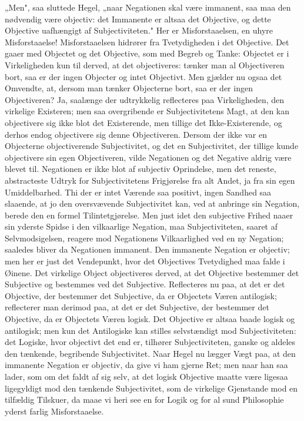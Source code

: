 \documentclass[12pt]{book}
\newcommand{\opage}[1]{\marginnote{\footnotesize\textit{[#1]}}}
\begin{document}
„Men", saa sluttede Hegel, „naar Negationen skal være immanent, saa maa den nødvendig være
objectiv: det Immanente er altsaa det Objective, og dette Objective uafhængigt af
Subjectiviteten." Her er Misforstaaelsen, en uhyre Misforstaaelse! Misforstaaelsen hidrører
fra Tvetydigheden i det Objective. Det gaaer med Objectet og det Objective, som med Begreb og
Tanke: Objectet er i Virkeligheden kun til derved, at det objectiveres: tænker man al
Objectiveren bort, saa er der ingen Objecter og intet Objectivt. Men gjælder nu ogsaa det
Omvendte, at, dersom man tænker Objecterne bort, saa er der ingen Objectiveren? Ja, saalænge
der udtrykkelig reflecteres paa Virkeligheden, den virkelige Existeren; men saa overgribende
er Subjectivitetens Magt, at den kan objectivere sig ikke blot det Existerende, men tillige
det Ikke-Existerende, og derhos endog objectivere sig denne Objectiveren. Dersom der ikke var
en Objecterne objectiverende Subjectivitet, og det en Subjectivitet, der tillige kunde
objectivere sin egen Objectiveren, vilde Negationen og det Negative aldrig være blevet til.
Negationen er ikke blot af subjectiv Oprindelse, men det reneste, abstracteste Udtryk for
Subjectivitetens Frigjørelse fra alt Andet, ja fra sin egen Umiddelbarhed. Thi der er intet
Værende saa positivt, ingen Sandhed saa slaaende, at jo den oversvævende Subjectivitet kan,
ved at anbringe sin Negation, berede den en formel Tilintetgjørelse. Men just idet den
\opage{149} subjective Frihed naaer sin yderste Spidse i den vilkaarlige Negation, maa Subjectiviteten,
saaret af Selvmodsigelsen, reagere mod Negationens Vilkaarlighed ved en ny Negation; saaledes
bliver da Negationen immanent. Den immanente Negation er objectiv; men her er just det
Vendepunkt, hvor det Objectives Tvetydighed maa falde i Øinene. Det virkelige Object
objectiveres derved, at det Objective bestemmer det Subjective og bestemmes ved det
Subjective. Reflecteres nu paa, at det er det Objective, der bestemmer det Subjective, da er
Objectets Væren antilogisk; reflecterer man derimod paa, at det er det Subjective, der
bestemmer det Objective, da er Objectets Væren logisk. Det Objective er altsaa baade logisk og
antilogisk; men kun det Antilogiske kan stilles selvstændigt mod Subjectiviteten: det Logiske,
hvor objectivt det end er, tilhører Subjectiviteten, ganske og aldeles den tænkende,
begribende Subjectivitet. Naar Hegel nu lægger Vægt paa, at den immanente Negation er
objectiv, da give vi ham gjerne Ret; men naar han saa lader, som om det faldt af sig selv, at
det logisk Objective maatte være ligesaa ligegyldigt mod den tænkende Subjectivitet, som de
virkelige Gjenstande mod en tilfældig Tilskuer, da maae vi heri see en for Logik og for al
sund Philosophie yderst farlig Misforstaaelse.
\end{document}
